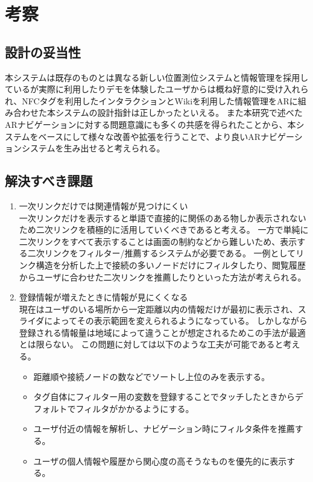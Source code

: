 \section{考察}

\subsection{設計の妥当性}
本システムは既存のものとは異なる新しい位置測位システムと情報管理を採用しているが実際に利用したりデモを体験したユーザからは概ね好意的に受け入れられ、NFCタグを利用したインタラクションとWikiを利用した情報管理をARに組み合わせた本システムの設計指針は正しかったといえる。
また本研究で述べたARナビゲーションに対する問題意識にも多くの共感を得られたことから、本システムをベースにして様々な改善や拡張を行うことで、より良いARナビゲーションシステムを生み出せると考えられる。

\subsection{解決すべき課題}

\begin{enumerate}
  \item 一次リンクだけでは関連情報が見つけにくい\\
  一次リンクだけを表示すると単語で直接的に関係のある物しか表示されないため二次リンクを積極的に活用していくべきであると考える。
  一方で単純に二次リンクをすべて表示することは画面の制約などから難しいため、表示する二次リンクをフィルター/推薦するシステムが必要である。
  一例としてリンク構造を分析した上で接続の多いノードだけにフィルタしたり、閲覧履歴からユーザに合わせた二次リンクを推薦したりといった方法が考えられる。
  \item 登録情報が増えたときに情報が見にくくなる\\
  現在はユーザのいる場所から一定距離以内の情報だけが最初に表示され、スライダによってその表示範囲を変えられるようになっている。
  しかしながら登録される情報量は地域によって違うことが想定されるためこの手法が最適とは限らない。
  この問題に対しては以下のような工夫が可能であると考える。
  \begin{itemize}
    \item 距離順や接続ノードの数などでソートし上位のみを表示する。
    \item タグ自体にフィルター用の変数を登録することでタッチしたときからデフォルトでフィルタがかかるようにする。
    \item ユーザ付近の情報を解析し、ナビゲーション時にフィルタ条件を推薦する。
    \item ユーザの個人情報や履歴から関心度の高そうなものを優先的に表示する。
  \end{itemize}
\end{enumerate}

